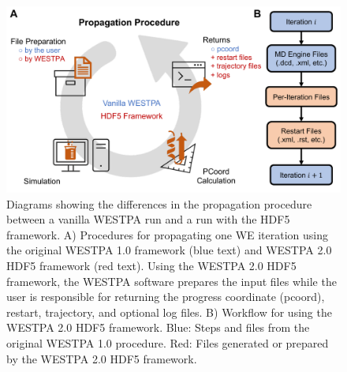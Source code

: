 \begin{figure}[t]
\centering
\includegraphics[width=\columnwidth]{figures/Figure5_membrane.pdf}
\caption{Diagrams showing the differences in the propagation procedure between a vanilla WESTPA run and a run with the HDF5 framework. 
A) Procedures for propagating one WE iteration using the original WESTPA 1.0 framework (blue text) and WESTPA 2.0 HDF5 framework (red text). 
Using the WESTPA 2.0 HDF5 framework, the WESTPA software prepares the input files while the user is responsible for returning the progress coordinate (pcoord), restart, trajectory, and optional log files. 
B) Workflow for using the WESTPA 2.0 HDF5 framework. 
Blue: Steps and files from the original WESTPA 1.0 procedure. 
Red: Files generated or prepared by the WESTPA 2.0 HDF5 framework. }
\end{figure}

